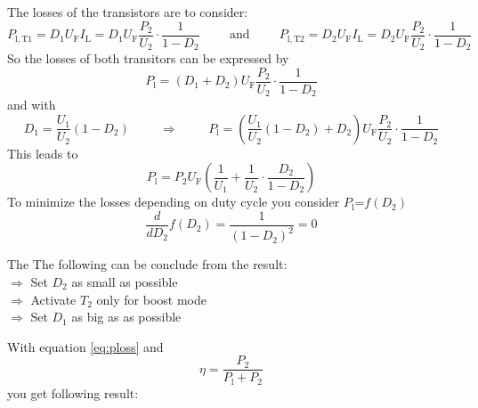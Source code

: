 \begin{solutionblock}
    The losses of the transistors are to consider:
    \begin{equation}
        P_\mathrm{l,T1}=D_1 U_\mathrm{F} I_\mathrm{L}=D_1 U_\mathrm{F} \frac{P_\mathrm{2}}{U_\mathrm{2}} \cdot \frac{1}{1-D_2}
        \hspace{1cm} \mathrm{and} \hspace{1cm}
        P_\mathrm{l,T2}=D_2 U_\mathrm{F} I_\mathrm{L}=D_2 U_\mathrm{F} \frac{P_\mathrm{2}}{U_\mathrm{2}} \cdot \frac{1}{1-D_2}
    \end{equation}
    So the losses of both transitors can be expressed by
    \begin{equation}
        P_\mathrm{l}=\left(D_1 +D_2\right) U_\mathrm{F} \frac{P_\mathrm{2}}{U_\mathrm{2}} \cdot \frac{1}{1-D_2}
    \end{equation}
    and with
    \begin{equation}
        D_1 =\frac{U_\mathrm{1}}{U_\mathrm{2}} \left(1 - D_2 \right) 
        \hspace{1cm} \Rightarrow \hspace{1cm}
        P_\mathrm{l}=\left(\frac{U_\mathrm{1}}{U_\mathrm{2}} \left(1 - D_2 \right)+D_2\right) U_\mathrm{F} \frac{P_\mathrm{2}}{U_\mathrm{2}} \cdot \frac{1}{1-D_2}
    \end{equation}
    This leads to
    \begin{equation}
        P_\mathrm{l}=P_\mathrm{2} U_\mathrm{F} \left(\frac{1}{U_\mathrm{1}} + \frac{1}{U_\mathrm{2}} \cdot \frac{D_2}{1-D_2}\right)
        \label{eq:ploss}
    \end{equation}
    To minimize the losses depending on duty cycle you consider $P_\mathrm{l}$=$f(D_2)$
    \begin{equation}
        \frac{d}{dD_2} f(D_2)= \frac{1}{\left(1 - D_2 \right)^2}=0
    \end{equation}

    The The following can be conclude from the result: \\
    $\Rightarrow$ Set $D_2$ as small as possible \\
    $\Rightarrow$ Activate $T_2$ only for boost mode \\
    $\Rightarrow$ Set $D_1$ as big as as possible \\
\end{solutionblock}

\begin{solutionblock}
    With equation \eqref{eq:ploss} and
    \begin{equation}
        \eta = \frac{P_\mathrm{2}}{P_\mathrm{l}+P_\mathrm{2}}
    \end{equation}
    you get following result:

    
    
    
\end{solutionblock}

